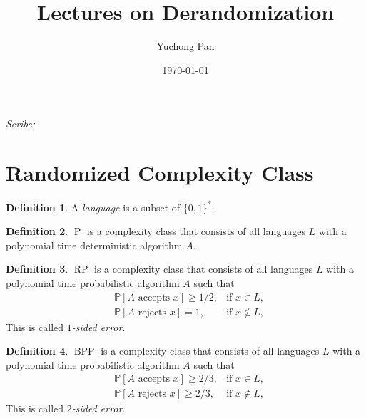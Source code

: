 \documentclass[letterpaper, reqno,11pt]{article}
\newcommand{\PP}{\mathbb{P}}
\DeclareMathOperator{\Poly}{P}
\DeclareMathOperator{\BPP}{BPP}
\DeclareMathOperator{\RP}{RP}
\begin{document}
\title{Lectures on Derandomization}
\author{Yuchong Pan}
\date{\today}
\newtheorem{theorem}{Theorem}
\newtheorem{lemma}[theorem]{Lemma}
\newtheorem{proposition}[theorem]{Proposition}
\newtheorem{corollary}[theorem]{Corollary}
\newtheorem{fact}[theorem]{Fact}
\newtheorem{claim}{Claim}
\newtheorem{exercise}{Exercise}
\theoremstyle{definition}
\newtheorem{definition}[theorem]{Definition}
%

\begin{framed}
 \hfill \thedate
\begin{center}
\Large{\thetitle}
\end{center}
 \hfill {\em Scribe: \theauthor}
\end{framed}

\section{Randomized Complexity Class}

\begin{definition}
  A \emph{language} is a subset of $\{ 0, 1 \}^*$.
\end{definition}

\begin{definition}
  $\Poly$ is a complexity class that consists of all languages $L$ with a polynomial time deterministic algorithm $A$.
\end{definition}

\begin{definition}
  $\RP$ is a complexity class that consists of all languages $L$ with a polynomial time probabilistic algorithm $A$ such that
  \begin{align*}
    & \PP[\text{$A$ accepts $x$}] \geq 1/2, & \text{if $x \in L$}, \\
    & \PP[\text{$A$ rejects $x$}] = 1, & \text{if $x \not \in L$},
  \end{align*}
  This is called \emph{$1$-sided error}.
\end{definition}

\begin{definition}
  $\BPP$ is a complexity class that consists of all languages $L$ with a polynomial time probabilistic algorithm $A$ such that
  \begin{align*}
    & \PP[\text{$A$ accepts $x$}] \geq 2/3, & \text{if $x \in L$}, \\
    & \PP[\text{$A$ rejects $x$}] \geq 2/3, & \text{if $x \not \in L$},
  \end{align*}
  This is called \emph{$2$-sided error}.
\end{definition}
\end{document}

